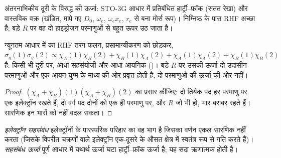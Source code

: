 \begin{omfigure}

{\small अंतरनाभिकीय दूरी के विरुद्ध  की ऊर्जा: STO-3G आधार में प्रतिबंधित
हार्ट्री--फ़ॉक (सतत रेखा) और वास्तविक वक्र (खंडित, मापे गए
$D_0$, $\omega_e$, $\omega_ex_e$, $r_e$ से बना मोर्स रूप)। निम्निष्ठ के पास
RHF अच्छा है; बड़े $R$ पर वह दो हाइड्रोजन परमाणुओं से बहुत ऊपर उठ जाता है।}
\end{omfigure}

\begin{proposition}[प्रतिबंधित हार्ट्री--फ़ॉक वियोजन पर विफल क्यों होता है]\label{prop:b3:computational-chemistry:rhf-dissociation}
न्यूनतम आधार में  का RHF तरंग फलन,
प्रसामान्यीकरण को छोड़कर, $\sigma_g(1)\sigma_g(2) \propto \chi_A(1)\chi_B(2) + \chi_B(1)\chi_A(2)
+ \chi_A(1)\chi_A(2) + \chi_B(1)\chi_B(2)$ है: किसी भी दूरी पर, आधा सहसंयोजी और आधा
आयनिक ()। बड़े $R$ पर उसकी ऊर्जा दो उदासीन परमाणुओं और एक
आयन-युग्म के माध्य की ओर प्रवृत्त होती है, दो परमाणुओं की ऊर्जा की ओर नहीं।
\end{proposition}

\begin{proof}
$(\chi_A + \chi_B)(1)(\chi_A + \chi_B)(2)$ का प्रसार कीजिए: दो तिर्यक पद हर परमाणु
पर एक इलेक्ट्रॉन रखते हैं, दो वर्ग पद दोनों को एक ही परमाणु पर, और $R$ जो भी हो,
भार बराबर रहते हैं। सारणिक इन भारों को नहीं बदल सकता।
\end{proof}

\begin{definition}\label{def:b3:computational-chemistry:correlation}
\emph{इलेक्ट्रॉन सहसंबंध} इलेक्ट्रॉनों के पारस्परिक
परिहार का वह भाग है जिसका वर्णन एकल सारणिक नहीं करता (जिसके
विपरीत चक्रणों वाले इलेक्ट्रॉन एक-दूसरे के औसत क्षेत्र में स्वतंत्र रूप से गति करते हैं)।
\emph{सहसंबंध ऊर्जा} पूर्ण आधार में यथार्थ
ऊर्जा घटा हार्ट्री--फ़ॉक ऊर्जा है; यह सदा
ऋणात्मक होती है।
\end{definition}

